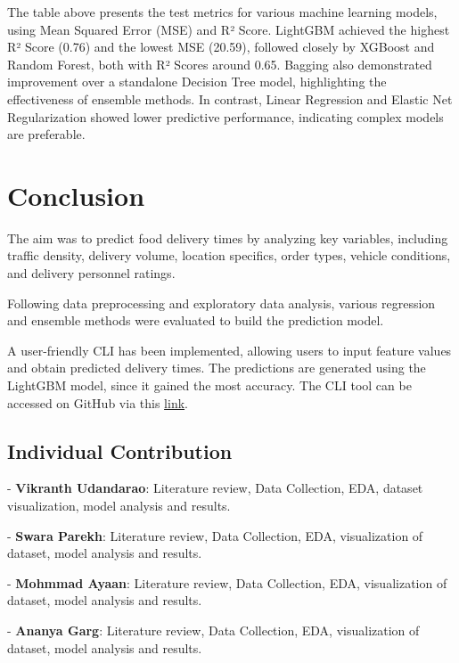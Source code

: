\documentclass[10pt,twocolumn,letterpaper]{article}
\begin{document}
    The table above presents the test metrics for various machine learning models, using Mean Squared Error (MSE) and R² Score. LightGBM achieved the highest R² Score (0.76) and the lowest MSE (20.59), followed closely by XGBoost and Random Forest, both with R² Scores around 0.65. Bagging also demonstrated improvement over a standalone Decision Tree model, highlighting the effectiveness of ensemble methods. In contrast, Linear Regression and Elastic Net Regularization showed lower predictive performance, indicating complex models are preferable.

\section{Conclusion}
    The aim was to predict food delivery times by analyzing key variables, including traffic density, delivery volume, location specifics, order types, vehicle conditions, and delivery personnel ratings.

    Following data preprocessing and exploratory data analysis, various regression and ensemble methods were evaluated to build the prediction model.

    A user-friendly CLI has been implemented, allowing users to input feature values and obtain predicted delivery times. The predictions are generated using the LightGBM model, since it gained the most accuracy. The CLI tool can be accessed on GitHub via this \href{https://github.com/Vikranth3140/Food-Delivery-Time-Prediction/blob/main/main.py}{link}.

    \subsection{Individual Contribution}
        - \textbf{Vikranth Udandarao}: Literature review, Data Collection, EDA, dataset visualization, model analysis and results.

        - \textbf{Swara Parekh}: Literature review, Data Collection, EDA, visualization of dataset, model analysis and results.

        - \textbf{Mohmmad Ayaan}: Literature review, Data Collection, EDA, visualization of dataset, model analysis and results.

        - \textbf{Ananya Garg}: Literature review, Data Collection, EDA, visualization of dataset, model analysis and results.

\newpage
\end{document}
